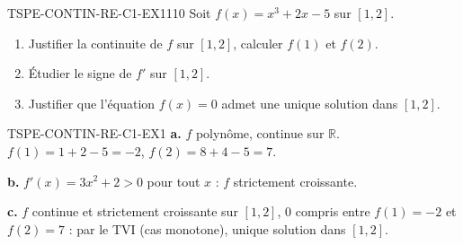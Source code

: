 

\begin{exercice}{TSPE-CONTIN-RE-C1-EX1}{1}{10}
Soit $f(x) = x^3 + 2x - 5$ sur $[1, 2]$.
\begin{enumerate}
  \item Justifier la continuite de $f$ sur $[1,2]$, calculer $f(1)$ et $f(2)$.
  \item Étudier le signe de $f'$ sur $[1,2]$.
  \item Justifier que l'équation $f(x)=0$ admet une unique solution dans $[1,2]$.
\end{enumerate}
\end{exercice}


\begin{corrige}{TSPE-CONTIN-RE-C1-EX1}
\textbf{a.} $f$ polynôme, continue sur $\mathbb{R}$. $f(1) = 1+2-5=-2$, $f(2)=8+4-5=7$.

\textbf{b.} $f'(x) = 3x^2+2 > 0$ pour tout $x$ : $f$ strictement croissante.

\textbf{c.} $f$ continue et strictement croissante sur $[1,2]$, $0$ compris entre $f(1)=-2$ et $f(2)=7$ : par le TVI (cas monotone), unique solution dans $[1,2]$.
\end{corrige}
